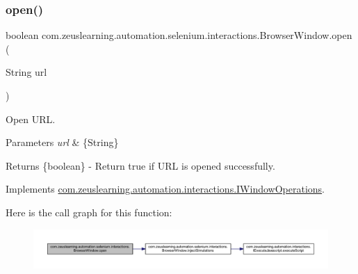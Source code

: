 \subsubsection{\texorpdfstring{open()}{open()}}
{\footnotesize\ttfamily boolean com.\+zeuslearning.\+automation.\+selenium.\+interactions.\+Browser\+Window.\+open (\begin{DoxyParamCaption}\item[{String}]{url }\end{DoxyParamCaption})\hspace{0.3cm}{\ttfamily [inline]}}

Open U\+RL.


\begin{DoxyParams}{Parameters}
{\em url} & \{String\} \\
\hline
\end{DoxyParams}
\begin{DoxyReturn}{Returns}
\{boolean\} -\/ Return {\ttfamily true} if U\+RL is opened successfully. 
\end{DoxyReturn}


Implements \hyperlink{interfacecom_1_1zeuslearning_1_1automation_1_1interactions_1_1IWindowOperations_a51671fb00e9eaafb2e49978a8bf3305d}{com.\+zeuslearning.\+automation.\+interactions.\+I\+Window\+Operations}.

Here is the call graph for this function\+:
\nopagebreak
\begin{figure}[H]
\begin{center}
\leavevmode
\includegraphics[width=350pt]{d8/d87/classcom_1_1zeuslearning_1_1automation_1_1selenium_1_1interactions_1_1BrowserWindow_a0944339f910fc20bbb074e393270c9cc_cgraph}
\end{center}
\end{figure}
\hypertarget{classcom_1_1zeuslearning_1_1automation_1_1selenium_1_1interactions_1_1BrowserWindow_ae774d056dd47837cc8b4c62e5fa8826a}{}\label{classcom_1_1zeuslearning_1_1automation_1_1selenium_1_1interactions_1_1BrowserWindow_ae774d056dd47837cc8b4c62e5fa8826a} 
